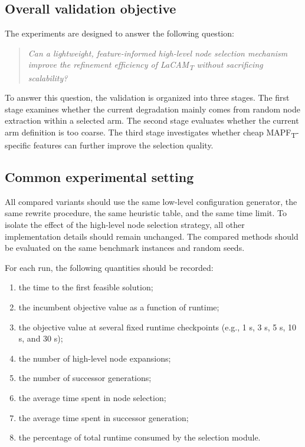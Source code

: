 \documentclass[lettersize,journal]{IEEEtran}
\begin{document}
\subsection{Overall validation objective}

The experiments are designed to answer the following question:
\begin{quote}
\emph{Can a lightweight, feature-informed high-level node selection mechanism improve the refinement efficiency of LaCAM\textsubscript{T} without sacrificing scalability?}
\end{quote}

To answer this question, the validation is organized into three stages. The first stage examines whether the current degradation mainly comes from random node extraction within a selected arm. The second stage evaluates whether the current arm definition is too coarse. The third stage investigates whether cheap MAPF\textsubscript{T}-specific features can further improve the selection quality.

\subsection{Common experimental setting}

All compared variants should use the same low-level configuration generator, the same rewrite procedure, the same heuristic table, and the same time limit. To isolate the effect of the high-level node selection strategy, all other implementation details should remain unchanged. The compared methods should be evaluated on the same benchmark instances and random seeds.

For each run, the following quantities should be recorded:
\begin{enumerate}[(1)]
    \item the time to the first feasible solution;
    \item the incumbent objective value as a function of runtime;
    \item the objective value at several fixed runtime checkpoints (e.g., 1 s, 3 s, 5 s, 10 s, and 30 s);
    \item the number of high-level node expansions;
    \item the number of successor generations;
    \item the average time spent in node selection;
    \item the average time spent in successor generation;
    \item the percentage of total runtime consumed by the selection module.
\end{enumerate}
\end{document}
